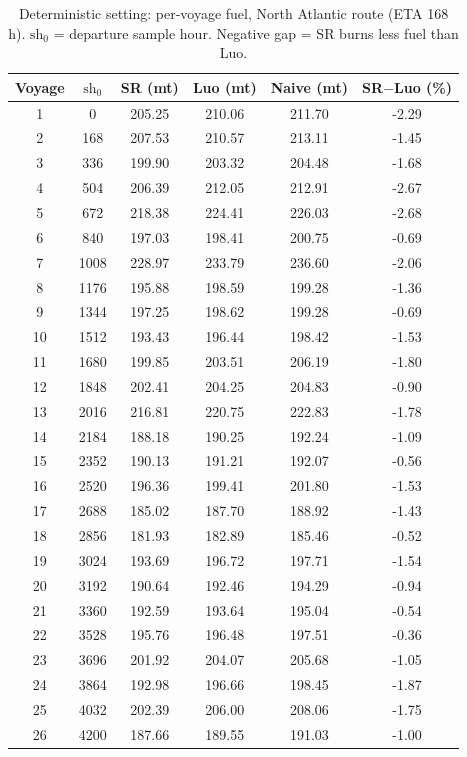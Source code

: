 \documentclass[review,authoryear]{elsarticle}
\begin{document}
\begin{table}[H]
\centering
\caption{Deterministic setting: per-voyage fuel, North Atlantic route (ETA 168 h). $\mathrm{sh}_0$ = departure
sample hour. Negative gap = SR burns less fuel than Luo.}
\label{tab:det-r2}
\begin{tabular}{
  S[table-format=2.0]
  S[table-format=4.0]
  S[table-format=3.2]
  S[table-format=3.2]
  S[table-format=3.2]
  S[table-format=-1.2]
}
\toprule
{Voyage} & {$\mathrm{sh}_0$} & {SR (mt)} & {Luo (mt)} & {Naive (mt)} & {SR$-$Luo (\%)} \\
  & 0    & 205.25 & 210.06 & 211.70 & -2.29 \\
2  & 168  & 207.53 & 210.57 & 213.11 & -1.45 \\
3  & 336  & 199.90 & 203.32 & 204.48 & -1.68 \\
4  & 504  & 206.39 & 212.05 & 212.91 & -2.67 \\
5  & 672  & 218.38 & 224.41 & 226.03 & -2.68 \\
6  & 840  & 197.03 & 198.41 & 200.75 & -0.69 \\
7  & 1008 & 228.97 & 233.79 & 236.60 & -2.06 \\
8  & 1176 & 195.88 & 198.59 & 199.28 & -1.36 \\
9  & 1344 & 197.25 & 198.62 & 199.28 & -0.69 \\
10 & 1512 & 193.43 & 196.44 & 198.42 & -1.53 \\
11 & 1680 & 199.85 & 203.51 & 206.19 & -1.80 \\
12 & 1848 & 202.41 & 204.25 & 204.83 & -0.90 \\
13 & 2016 & 216.81 & 220.75 & 222.83 & -1.78 \\
14 & 2184 & 188.18 & 190.25 & 192.24 & -1.09 \\
15 & 2352 & 190.13 & 191.21 & 192.07 & -0.56 \\
16 & 2520 & 196.36 & 199.41 & 201.80 & -1.53 \\
17 & 2688 & 185.02 & 187.70 & 188.92 & -1.43 \\
18 & 2856 & 181.93 & 182.89 & 185.46 & -0.52 \\
19 & 3024 & 193.69 & 196.72 & 197.71 & -1.54 \\
20 & 3192 & 190.64 & 192.46 & 194.29 & -0.94 \\
21 & 3360 & 192.59 & 193.64 & 195.04 & -0.54 \\
22 & 3528 & 195.76 & 196.48 & 197.51 & -0.36 \\
23 & 3696 & 201.92 & 204.07 & 205.68 & -1.05 \\
24 & 3864 & 192.98 & 196.66 & 198.45 & -1.87 \\
25 & 4032 & 202.39 & 206.00 & 208.06 & -1.75 \\
26 & 4200 & 187.66 & 189.55 & 191.03 & -1.00 \\
\bottomrule
\end{tabular}
\end{table}
\end{document}
